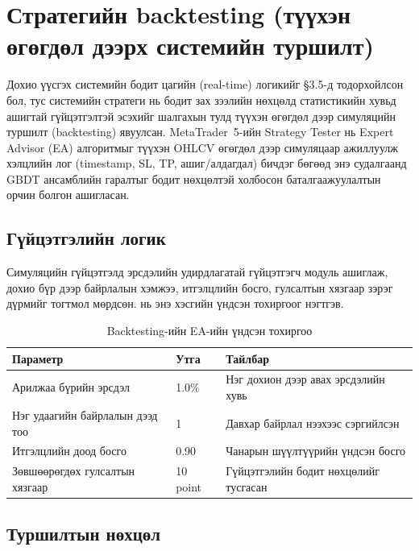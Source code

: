 \section{Стратегийн backtesting (түүхэн өгөгдөл дээрх системийн туршилт)}

Дохио үүсгэх системийн бодит цагийн (real-time) логикийг §3.5-д тодорхойлсон бол, тус системийн стратеги нь бодит зах зээлийн нөхцөлд статистикийн хувьд ашигтай гүйцэтгэлтэй эсэхийг шалгахын тулд түүхэн өгөгдөл дээр симуляцийн туршилт (backtesting) явуулсан. MetaTrader~5-ийн Strategy Tester нь Expert Advisor (EA) алгоритмыг түүхэн OHLCV өгөгдөл дээр симуляцаар ажиллуулж хэлцлийн лог (timestamp, SL, TP, ашиг/алдагдал) бичдэг бөгөөд энэ судалгаанд GBDT ансамблийн гаралтыг бодит нөхцөлтэй холбосон баталгаажуулалтын орчин болгон ашигласан.

\subsection{Гүйцэтгэлийн логик}

Симуляцийн гүйцэтгэлд эрсдэлийн удирдлагатай гүйцэтгэгч модуль ашиглаж, дохио бүр дээр байрлалын хэмжээ, итгэлцлийн босго, гулсалтын хязгаар зэрэг дүрмийг тогтмол мөрдсөн.  нь энэ хэсгийн үндсэн тохиргоог нэгтгэв.

\begin{table}[H]
\centering
\caption{Backtesting-ийн EA-ийн үндсэн тохиргоо}
\label{tab:ea_params}
\begin{tabular}{|l|l|l|}
\hline
\textbf{Параметр} & \textbf{Утга} & \textbf{Тайлбар} \\ \hline
Арилжаа бүрийн эрсдэл & 1.0\% & Нэг дохион дээр авах эрсдэлийн хувь \\ \hline
Нэг удаагийн байрлалын дээд тоо & 1 & Давхар байрлал нээхээс сэргийлсэн \\ \hline
Итгэлцлийн доод босго & 0.90 & Чанарын шүүлтүүрийн үндсэн босго \\ \hline
Зөвшөөрөгдөх гулсалтын хязгаар & 10 point & Гүйцэтгэлийн бодит нөхцөлийг тусгасан \\ \hline
\end{tabular}
\end{table}


\subsection{Туршилтын нөхцөл}

